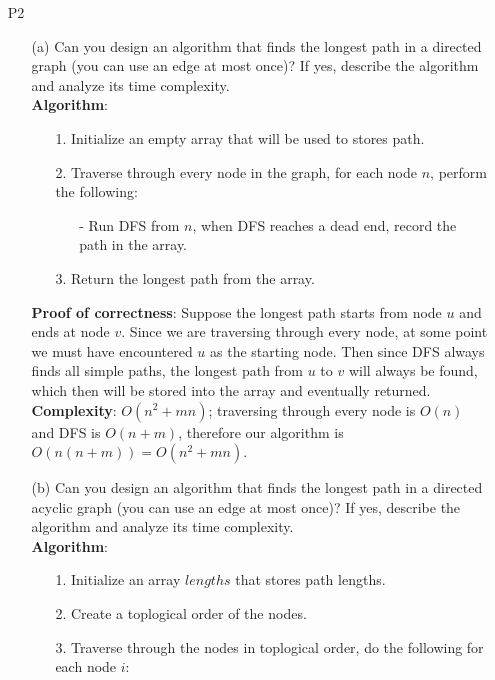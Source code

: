 \documentclass{article}
\begin{document}
\begin{itemize}
    \item [P2]
          \begin{itemize}
              \item [(a)] Can you design an algorithm that finds the longest path in a directed graph (you can use an edge at most once)? If yes, describe the algorithm and analyze its time complexity.\\
                    \textbf{Algorithm}:
                    \begin{itemize}
                        \item [1.] Initialize an empty array that will be used to stores path.
                        \item [2.] Traverse through every node in the graph, for each node $n$, perform the following:
                              \begin{itemize}
                                  \item [-] Run DFS from $n$, when DFS reaches a dead end, record the path in the array.
                              \end{itemize}
                        \item [3.] Return the longest path from the array.
                    \end{itemize}
                    \textbf{Proof of correctness}: Suppose the longest path starts from node $u$ and ends at node $v$. Since we are traversing through every node, at some point we must have encountered $u$ as the starting node. Then since DFS always finds all simple paths, the longest path from $u$ to $v$ will always be found, which then will be stored into the array and eventually returned.\\
                    \textbf{Complexity}: $O(n^2+mn)$; traversing through every node is $O(n)$ and DFS is $O(n+m)$, therefore our algorithm is $O(n(n+m))=O(n^2+mn)$.
              \item [(b)] Can you design an algorithm that finds the longest path in a directed acyclic graph (you can use an edge at most once)? If yes, describe the algorithm and analyze its time complexity.\\
                    \textbf{Algorithm}:
                    \begin{itemize}
                        \item [1.] Initialize an array $lengths$ that stores path lengths.
                        \item [2.] Create a toplogical order of the nodes.
                        \item [3.] Traverse through the nodes in toplogical order, do the following for each node $i$:

\end{itemize}
\end{itemize}
\end{itemize}
\end{document}
